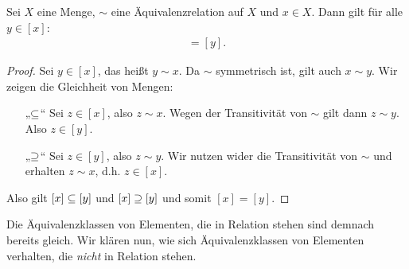 \begin{bem}
\label{bem:vertreter}

  Sei $X$ eine Menge, $\sim$ eine Äquivalenzrelation auf $X$ und $x\in
  X$. Dann gilt für alle $y \in [ x ]$:
  \begin{align*}
    [ x ] =  [ y ].
  \end{align*}
  
  \begin{proof}

    Sei $y\in [ x ]$, das heißt $y\sim x$. Da $\sim$ symmetrisch ist,
    gilt auch $x\sim y$. Wir zeigen die Gleichheit von Mengen:

    \begin{itemize}

      \item[„$\subseteq$“] Sei $z \in [ x ]$, also $z\sim x$. Wegen der
        Transitivität von $\sim$ gilt dann $z\sim y$. Also $z \in [ y ]$.

      \item[„$\supseteq$“] Sei $z \in [ y ]$, also $z\sim y$. Wir nutzen wider
        die Transitivität von $\sim$ und erhalten $z\sim x$, d.h. $z\in [
        x ]$.

    \end{itemize}
    
    \noindent Also gilt $[ x ] \subseteq  [ y ]$ und $[ x ] \supseteq  [ y ]$ und
    somit $[ x ] = [ y ]$.

  \end{proof}
  
\end{bem}


Die Äquivalenzklassen von Elementen, die in Relation stehen sind demnach
bereits gleich. Wir klären nun, wie sich Äquivalenzklassen von Elementen
verhalten, die \emph{nicht} in Relation stehen.


